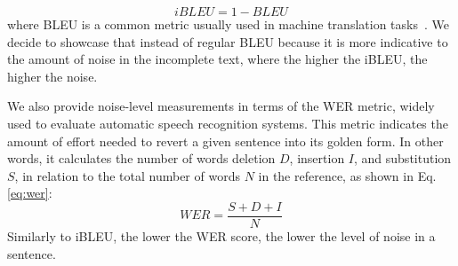 \documentclass[review]{elsarticle}
\begin{document}
\begin{equation} \label{eq:ibleu}
    iBLEU = 1-BLEU
\end{equation}
where BLEU is a common metric usually used in machine translation tasks~\cite{papineni2002bleu}. We decide to showcase that instead of regular BLEU because it is more indicative to the amount of noise in the incomplete text, where the higher the iBLEU, the higher the noise.

We also provide noise-level measurements in terms of the WER metric, widely used to evaluate automatic speech recognition systems. This metric indicates the amount of effort needed to revert a given sentence into its golden form. In other words, it calculates the number of words deletion $D$, insertion $I$, and substitution $S$, in relation to the total number of words $N$ in the reference, as shown in Eq. \eqref{eq:wer}:
\begin{equation} 
\label{eq:wer}
    WER = \frac{S+D+I}{N}
\end{equation}
Similarly to iBLEU, the lower the WER score, the lower the level of noise in a sentence.


\begin{table}[ht!]
  \caption{Example of sentence from Chatbot NLU Corpus with different TTS-STT combinations and their respective inverted BLEU and WER scores, which denote the level of noise in the text.}
  \label{tbl:missing_data}
  \bigskip
  \centering
\end{table}
\end{document}
